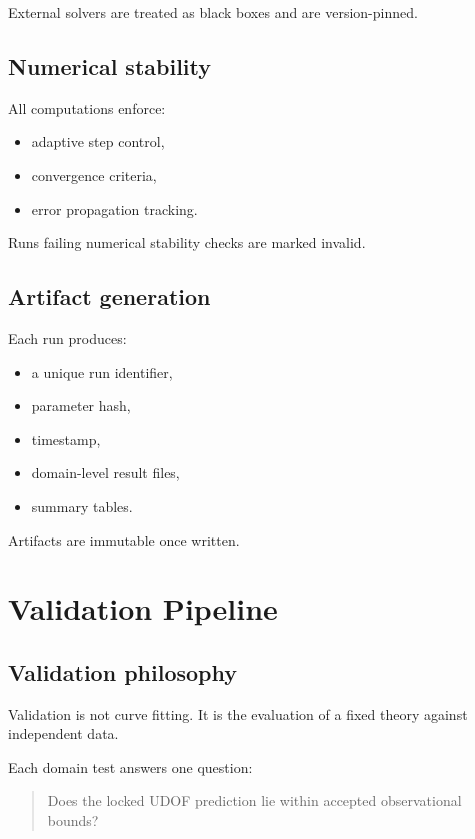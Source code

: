 \documentclass[11pt]{book}
\begin{document}
External solvers are treated as black boxes and are version-pinned.

\section{Numerical stability}

All computations enforce:
\begin{itemize}
\item adaptive step control,
\item convergence criteria,
\item error propagation tracking.
\end{itemize}

Runs failing numerical stability checks are marked invalid.

\section{Artifact generation}

Each run produces:
\begin{itemize}
\item a unique run identifier,
\item parameter hash,
\item timestamp,
\item domain-level result files,
\item summary tables.
\end{itemize}

Artifacts are immutable once written.

\chapter{Validation Pipeline}

\section{Validation philosophy}

Validation is not curve fitting.
It is the evaluation of a fixed theory against independent data.

Each domain test answers one question:
\begin{quote}
Does the locked UDOF prediction lie within accepted observational bounds?
\end{quote}
\end{document}

